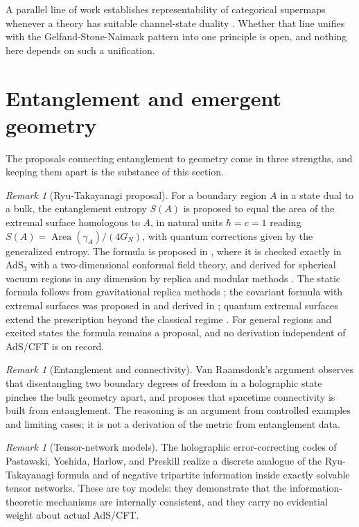 \documentclass[11pt,letterpaper]{article}
\theoremstyle{definition}
\theoremstyle{remark}
\newtheorem{remark}[theorem]{Remark}
\begin{document}
A parallel line of work establishes representability of categorical supermaps whenever a theory has suitable channel-state duality \cite{hefford-wilson, whh}. Whether that line unifies with the Gelfand-Stone-Naimark pattern into one principle is open, and nothing here depends on such a unification.

\section{Entanglement and emergent geometry}
\label{sec:entanglement}

The proposals connecting entanglement to geometry come in three strengths, and keeping them apart is the substance of this section.

\begin{remark}[Ryu-Takayanagi proposal]
\label{rem:rt}
For a boundary region $A$ in a state dual to a bulk, the entanglement entropy $S(A)$ is proposed \cite{rt} to equal the area of the extremal surface homologous to $A$, in natural units $\hbar = c = 1$ reading $S(A) = \operatorname{Area}(\gamma_A)/(4G_N)$, with quantum corrections given by the generalized entropy. The formula is proposed in \cite{rt}, where it is checked exactly in AdS$_3$ with a two-dimensional conformal field theory, and derived for spherical vacuum regions in any dimension by replica and modular methods \cite{chc}. The static formula follows from gravitational replica methods \cite{lm}; the covariant formula with extremal surfaces was proposed in \cite{hrt} and derived in \cite{dlr}; quantum extremal surfaces extend the prescription beyond the classical regime \cite{ew}. For general regions and excited states the formula remains a proposal, and no derivation independent of AdS/CFT is on record.
\end{remark}

\begin{remark}[Entanglement and connectivity]
\label{rem:vr}
Van Raamsdonk's argument \cite{vr} observes that disentangling two boundary degrees of freedom in a holographic state pinches the bulk geometry apart, and proposes that spacetime connectivity is built from entanglement. The reasoning is an argument from controlled examples and limiting cases; it is not a derivation of the metric from entanglement data.
\end{remark}

\begin{remark}[Tensor-network models]
\label{rem:happy}
The holographic error-correcting codes of Pastawski, Yoshida, Harlow, and Preskill \cite{happy} realize a discrete analogue of the Ryu-Takayanagi formula and of negative tripartite information inside exactly solvable tensor networks. These are toy models: they demonstrate that the information-theoretic mechanisms are internally consistent, and they carry no evidential weight about actual AdS/CFT.
\end{remark}
\end{document}
